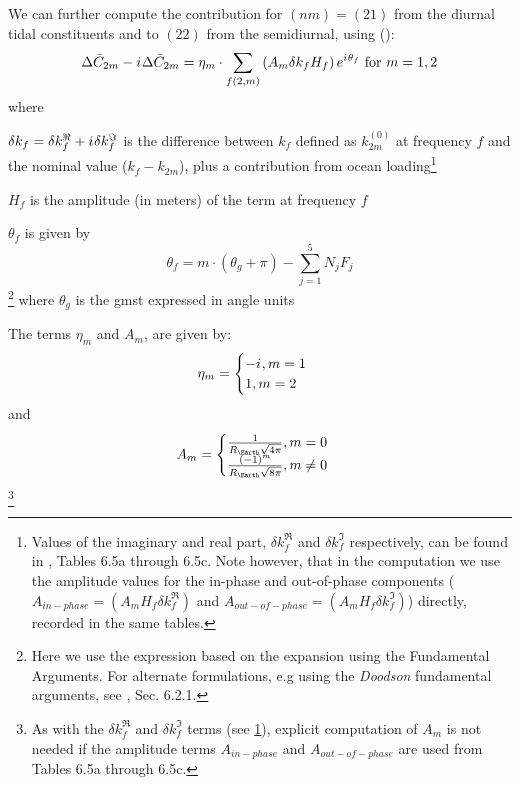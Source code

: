 We can further compute the contribution for $(nm)=(21)$ from the 
diurnal tidal constituents and to $(22)$ from the semidiurnal, using 
(\cite{iers2010}):
\begin{equation}
  \Delta \bar{C}_{2m} - {i\mkern1mu} \Delta \bar{C}_{2m} = 
    \eta _m \cdot \sum _{f(2,m)} \left( A_m \delta k_f H_f\right) e^{{i\mkern1mu} \theta _f} 
    \text{ for } m=1,2
  \label{eq:iers1068b}
\end{equation}
where 
\begin{description}
  \item $\delta k_f = \delta k^\Re _f + {i\mkern1mu} \delta k^\Im _f$ is the difference 
  between $k_f$ defined as $k^{(0)}_{2m}$ at frequency $f$ and the 
  nominal value ($k_f - k_{2m}$), plus a contribution from ocean 
  loading\footnote{\label{fn:set-coefs}Values of the imaginary and real part, $\delta k^\Re _f$ and 
  $\delta k^\Im _f$ respectively, can be found in \cite{iers2010}, Tables 6.5a 
  through 6.5c. Note however, that in the computation we use the amplitude values 
  for the in-phase and out-of-phase components ($A_{in-phase} = \left(A_m H_f \delta k^\Re _f \right)$ 
  and $A_{out-of-phase} = \left( A_m H_f \delta k^\Im _f \right)$) directly, recorded 
  in the same tables.}
  \item $H_f$ is the amplitude (in meters) of the term at frequency $f$
  \item $\theta _f$ is given by 
  \begin{equation} \theta _f = m \cdot ( \theta _g + \pi ) - \sum ^5_{j=1} N_j F_j \end{equation}
  \footnote{Here we use the expression based on the expansion using the Fundamental 
  Arguments. For alternate formulations, e.g using the \emph{Doodson} fundamental 
  arguments, see \cite{iers2010}, Sec. 6.2.1.}
  where $\theta _g$ is the \gls{gmst} expressed in angle units

  \item The terms $\eta _m$ and $A_m$, are given by: 
  \begin{equation}
  \eta _m = 
    \begin{cases} -{i\mkern1mu} , m=1 \\ 1 , m=2\end{cases}
  \end{equation} and
  \begin{equation} 
    A_m = \begin{cases} 
        \frac{1}{R_{\Earth}\sqrt{4 \pi}}, m=0\\
        \frac{(-1)^m}{R_{\Earth}\sqrt{8 \pi}}, m \ne 0
    \end{cases}
  \end{equation}\footnote{As with the $\delta k^\Re _f$ and $\delta k^\Im _f$ terms 
  (see \ref{fn:set-coefs}), explicit computation of $A_m$ is not needed if the 
  amplitude terms $A_{in-phase}$ and $A_{out-of-phase}$ are used from 
  \cite{iers2010} Tables 6.5a through 6.5c.}
\end{description}

